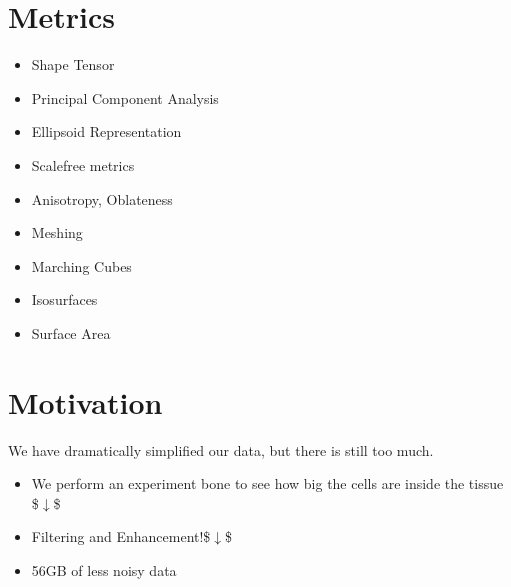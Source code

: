 \documentclass[letterpaper,10pt,english]{sphinxmanual}
\begin{document}
\section{Metrics}
\label{\detokenize{06-ShapeAnalysis:metrics}}\begin{itemize}
\item {} 
\sphinxAtStartPar
Shape Tensor

\item {} 
\sphinxAtStartPar
Principal Component Analysis

\item {} 
\sphinxAtStartPar
Ellipsoid Representation

\item {} 
\sphinxAtStartPar
Scale\sphinxhyphen{}free metrics

\item {} 
\sphinxAtStartPar
Anisotropy, Oblateness

\item {} 
\sphinxAtStartPar
Meshing

\item {} 
\sphinxAtStartPar
Marching Cubes

\item {} 
\sphinxAtStartPar
Isosurfaces

\item {} 
\sphinxAtStartPar
Surface Area

\end{itemize}


\section{Motivation}
\label{\detokenize{06-ShapeAnalysis:motivation}}
\sphinxAtStartPar
We have dramatically simplified our data, but there is still too much.
\begin{itemize}
\item {} 
\sphinxAtStartPar
We perform an experiment bone to see how big the cells are inside the tissue
\$\(\downarrow\)\$ 

\end{itemize}

\sphinxAtStartPar
{}
\begin{itemize}
\item {} 
\sphinxAtStartPar
Filtering and Enhancement!\$\(\downarrow\)\$

\item {} 
\sphinxAtStartPar
56GB of less noisy data

\end{itemize}
\end{document}
